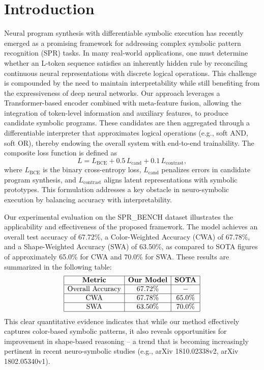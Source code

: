 \documentclass[11pt]{article}
\begin{document}
\section{Introduction}
Neural program synthesis with differentiable symbolic execution has recently emerged as a promising framework for addressing complex symbolic pattern recognition (SPR) tasks. In many real-world applications, one must determine whether an L-token sequence satisfies an inherently hidden rule by reconciling continuous neural representations with discrete logical operations. This challenge is compounded by the need to maintain interpretability while still benefiting from the expressiveness of deep neural networks. Our approach leverages a Transformer-based encoder combined with meta-feature fusion, allowing the integration of token-level information and auxiliary features, to produce candidate symbolic programs. These candidates are then aggregated through a differentiable interpreter that approximates logical operations (e.g., soft AND, soft OR), thereby endowing the overall system with end-to-end trainability. The composite loss function is defined as
\[
L = L_{\text{BCE}} + 0.5\, L_{\text{cand}} + 0.1\, L_{\text{contrast}},
\]
where \(L_{\text{BCE}}\) is the binary cross-entropy loss, \(L_{\text{cand}}\) penalizes errors in candidate program synthesis, and \(L_{\text{contrast}}\) aligns latent representations with symbolic prototypes. This formulation addresses a key obstacle in neuro-symbolic execution by balancing accuracy with interpretability.

Our experimental evaluation on the SPR\_BENCH dataset illustrates the applicability and effectiveness of the proposed framework. The model achieves an overall test accuracy of 67.72\%, a Color-Weighted Accuracy (CWA) of 67.78\%, and a Shape-Weighted Accuracy (SWA) of 63.50\%, as compared to SOTA figures of approximately 65.0\% for CWA and 70.0\% for SWA. These results are summarized in the following table:
\[
\begin{array}{|c|c|c|}
\hline
\textbf{Metric} & \textbf{Our Model} & \textbf{SOTA} \\
\hline
\text{Overall Accuracy} & 67.72\% & - \\
\hline
\text{CWA} & 67.78\% & 65.0\% \\
\hline
\text{SWA} & 63.50\% & 70.0\% \\
\hline
\end{array}
\]
This clear quantitative evidence indicates that while our method effectively captures color-based symbolic patterns, it also reveals opportunities for improvement in shape-based reasoning – a trend that is becoming increasingly pertinent in recent neuro-symbolic studies (e.g., arXiv 1810.02338v2, arXiv 1802.05340v1).
\end{document}

